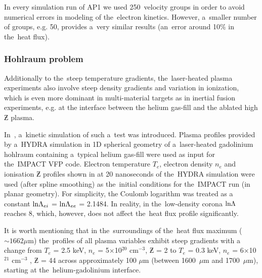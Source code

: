 In every simulation run of AP1 we used 250~velocity groups in order to avoid
numerical errors in modeling of the~electron kinetics. However, a~smaller 
number of groups, e.g. 50, provides a~very similar results 
(an~error around 10$\%$ in the~heat flux).

\subsubsection{Hohlraum problem}
Additionally to the~steep temperature gradients, the~laser-heated plasma 
experiments also involve steep density gradients and variation in ionization,
which is even more dominant in multi-material targets as in inertial
fusion experiments, e.g. at the interface between the helium gas-fill and 
the ablated high $\Zbar$ plasma.

In~\cite{Brodrick_PoP2017}, a~kinetic simulation of such a~test was introduced.
Plasma profiles provided by a~HYDRA simulation in 1D spherical
geometry of a~laser-heated gadolinium hohlraum containing a~typical helium 
gas-fill were used as input for the~IMPACT \cite{Kingham_JCP2004} VFP code. 
Electron temperature $T_e$, electron density $n_e$ and ionisation $\Zbar$ 
profiles shown in  at 20 nanoseconds of 
the~HYDRA simulation were used (after spline smoothing) as 
the~initial conditions for the~IMPACT run (in planar geometry). 
For simplicity, the Coulomb logarithm was treated as a
constant $\text{ln}\Lambda_{ei}$ = $\text{ln}\Lambda_{ee}$ = 2.1484. In reality, in the~low-density 
corona $\text{ln}\Lambda$ reaches 8, which, however, does not affect the~heat flux profile 
significantly. 

It is worth mentioning that in the~surroundings of the~heat flux maximum 
($\sim 1662 \mu$m) the~profiles of all plasma variables exhibit steep gradients 
with a change from $T_e$ = 2.5 keV, $n_e$ = 5$\times$10$^{20}$ cm$^{−3}$, 
$\Zbar$ = 2 to $T_e$ = 0.3 keV, $n_e$ = 6$\times$10$^{21}$ cm$^{−3}$ , 
$\Zbar$ = 44 across approximately 100 $\mu$m 
(between 1600~$\mu$m and 1700~$\mu$m), starting at the~helium-gadolinium 
interface.  


